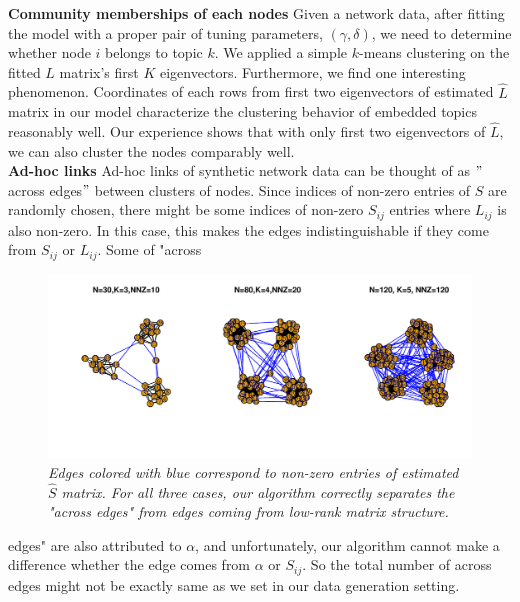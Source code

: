 \documentclass{article}
\begin{document}
\noindent \textbf{Community memberships of each nodes} Given a network data, after fitting the model with a proper pair of tuning parameters, $(\gamma,\delta)$, we need to determine whether node $i$ belongs to topic $k$. We applied a simple $k$-means clustering on the fitted $L$ matrix's first $K$ eigenvectors. Furthermore, we find one interesting phenomenon. Coordinates of each rows from first two eigenvectors of estimated $\hat{L}$ matrix in our model characterize the clustering behavior of embedded topics reasonably well. Our experience shows that with only first two eigenvectors of $\hat{L}$, we can also cluster the nodes comparably well. \\

\noindent \textbf{Ad-hoc links} Ad-hoc links of synthetic network data can be thought of as $"$across edges$"$ between clusters of nodes. Since indices of non-zero entries of $S$ are randomly chosen, there might be some indices of non-zero $S_{ij}$ entries where $L_{ij}$ is also non-zero. In this case, this makes the edges indistinguishable if they come from $S_{ij}$ or $L_{ij}$. Some of "across 

\begin{figure}[!h]
\begin{center}
\includegraphics[scale=0.75]{Fig2.pdf}
\caption{\it Edges colored with blue correspond to non-zero entries of estimated $\hat{S}$ matrix. For all three cases, our algorithm correctly separates the "across edges" from edges coming from low-rank matrix structure.}
\end{center}
\label{fig:figure2}
\end{figure}

\noindent edges" are also attributed to $\alpha$, and unfortunately, our algorithm cannot make a difference whether the edge comes from $\alpha$ or $S_{ij}$. So the total number of across edges might not be exactly same as we set in our data generation setting. \\
\end{document}
